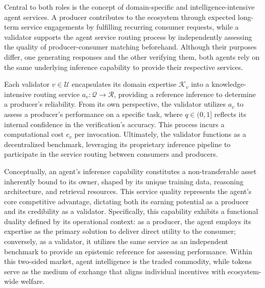 Central to both roles is the concept of domain-specific and intelligence-intensive agent services. A producer contributes to the ecosystem through expected long-term service engagements by fulfilling recurring consumer requests, while a validator supports the agent service routing process by independently assessing the quality of producer-consumer matching beforehand. Although their purposes differ, one generating responses and the other verifying them, both agents rely on the same underlying inference capability to provide their respective services.

\begin{definition}\label{def:agent-service-routing}
Each validator $v \in \mathcal{U}$ encapsulates its domain expertise $\mathcal{K}_v$ into a knowledge-intensive routing service $a_v: \mathcal{Q} \rightarrow \mathcal{R}$, providing a reference inference to determine a producer's reliability. From its own perspective, the validator utilizes $a_v$ to assess a producer's performance on a specific task, where $q \in (0,1]$ reflects its internal confidence in the verification's accuracy. This process incurs a computational cost $c_v$ per invocation. Ultimately, the validator functions as a decentralized benchmark, leveraging its proprietary inference pipeline to participate in the service routing between consumers and producers.
\end{definition}



Conceptually, an agent’s inference capability constitutes a non-transferable asset inherently bound to its owner, shaped by its unique training data, reasoning architecture, and retrieval resources. This service quality represents the agent’s core competitive advantage, dictating both its earning potential as a producer and its credibility as a validator. Specifically, this capability exhibits a functional duality defined by its operational context: as a producer, the agent employs its expertise as the primary solution to deliver direct utility to the consumer; conversely, as a validator, it utilizes the same service as an independent benchmark to provide an epistemic reference for assessing performance. Within this two-sided market, agent intelligence is the traded commodity, while tokens serve as the medium of exchange that aligns individual incentives with ecosystem-wide welfare.

